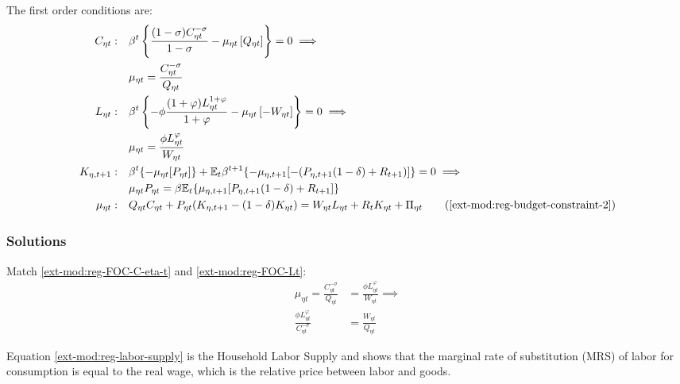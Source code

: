 \documentclass[../thesis.tex]{subfiles}
\begin{document}
The first order conditions are:
\begin{align}
	C_{\eta t}: &\quad \beta^t \left\{ \frac{(1 -\sigma) C_{\eta t}^{-\sigma}}{1-\sigma} - \mu_{\eta t} \left[ Q_{\eta t} \right] \right\} = 0 \implies \nonumber \\
	&\quad \mu_{\eta t} = \frac{C_{\eta t}^{-\sigma}}{Q_{\eta t}} \label{ext-mod:reg-FOC-C-eta-t}
	\\
	L_{\eta t}: &\quad \beta^t \left\{ -\phi \frac{(1+\varphi) L_{\eta t}^{1 + \varphi}}{1 + \varphi} - \mu_{\eta t} \left[ -W_{\eta t} \right] \right\} = 0 \implies \nonumber \\
	&\quad \mu_{\eta t} = \frac{\phi L_{\eta t}^{\varphi}}{W_{\eta t}} \label{ext-mod:reg-FOC-Lt}
	\\
	K_{\eta,t+1}: &\quad \beta^t \{-\mu_{\eta t} [P_{\eta t}] \} + \mathbb{E}_{t} \beta^{t+1} \{ -\mu_{\eta,t+1} [-(P_{\eta,t+1} (1 - \delta) + R_{t+1})] \} = 0 \implies \nonumber \\
	&\quad \mu_{\eta t} P_{\eta t} = \beta \mathbb{E}_{t} \{ \mu_{\eta,t+1} [P_{\eta,t+1} (1 - \delta) + R_{t+1}] \} \label{ext-mod:reg-FOC-Kt}
	\\
	\mu_{\eta t}: &\quad Q_{\eta t} C_{\eta t} + P_{\eta t} (K_{\eta,t+1} - (1 - \delta) K_{\eta t}) = W_{\eta t} L_{\eta t} + R_{t} K_{\eta t} + \Pi_{\eta t} \tag{\ref{ext-mod:reg-budget-constraint-2}}
\end{align}

\subsubsection*{Solutions}

Match \ref{ext-mod:reg-FOC-C-eta-t} and \ref{ext-mod:reg-FOC-Lt}:
\begin{align}
	\mu_{\eta t} = \frac{ C_{\eta t}^{-\sigma}}{Q_{\eta t}} &= \frac{\phi L_{\eta t}^{\varphi}}{W_{\eta t}} \implies \nonumber \\
	\frac{\phi L_{\eta t}^{\varphi}}{C_{\eta t}^{-\sigma}} &= \frac{W_{\eta t}}{Q_{\eta t}} \label{ext-mod:reg-labor-supply}
\end{align}

Equation \ref{ext-mod:reg-labor-supply} is the Household Labor Supply and shows that the marginal rate of substitution (MRS) of labor for consumption is equal to the real wage, which is the relative price between labor and goods.
\end{document}
